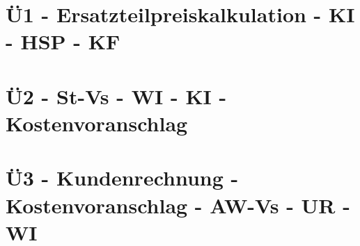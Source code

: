 \section{Ü1 - Ersatzteilpreiskalkulation - KI - HSP - KF}\label{sec:U01-Ersatzteilpreiskalkulation-KI-HSP-KF}

 \newpage


\section{Ü2 - St-Vs - WI - KI - Kostenvoranschlag}\label{sec:U02-StVs-WI-KI-Kostenvoranschlag}

 \newpage


\section{Ü3 - Kundenrechnung - Kostenvoranschlag - AW-Vs - UR - WI}\label{sec:U03-Kundenrechnung-Kostenvoranschlag-AW-Vs-UR-WI}


 \newpage

